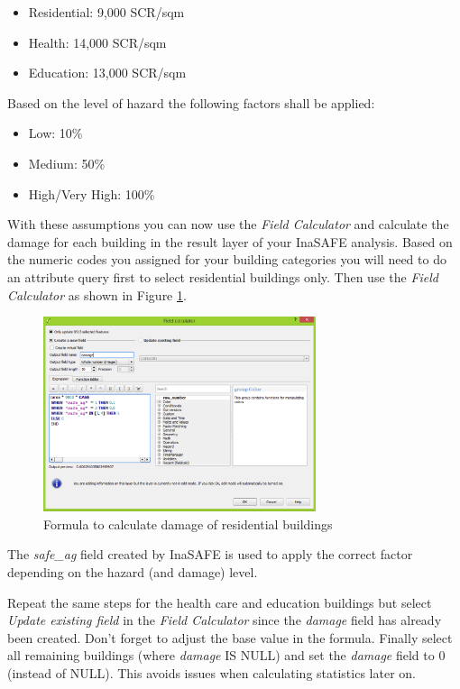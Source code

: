 \documentclass[a4paper,12pt,titlepage]{article}
\begin{document}
\begin{itemize}
	\item Residential: 9,000 SCR/sqm
	\item Health: 14,000 SCR/sqm
	\item Education: 13,000 SCR/sqm
\end{itemize}

Based on the level of hazard the following factors shall be applied:

\begin{itemize}
	\item Low: 10\%
	\item Medium: 50\%
	\item High/Very High: 100\%
\end{itemize}

With these assumptions you can now use the \textit{Field Calculator} and calculate the damage for each building in the result layer of your InaSAFE analysis. Based on the numeric codes you assigned for your building categories you will need to do an attribute query first to select residential buildings only. Then use the \textit{Field Calculator} as shown in Figure \ref{fig:calc_damage}.

\begin{figure}[htb]
	\centering
	\includegraphics[width=8cm]{Images/calc_damage.png}
	\caption{Formula to calculate damage of residential buildings}\label{fig:calc_damage}
\end{figure}

The \textit{safe\_ag} field created by InaSAFE is used to apply the correct factor depending on the hazard (and damage) level.

Repeat the same steps for the health care and education buildings but select \textit{Update existing field} in the \textit{Field Calculator} since the \textit{damage} field has already been created. Don't forget to adjust the base value in the formula. Finally select all remaining buildings (where \textit{damage} IS NULL) and set the \textit{damage} field to 0 (instead of NULL). This avoids issues when calculating statistics later on.
\end{document}
